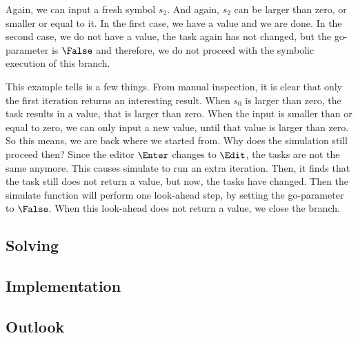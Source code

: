 Again, we can input a fresh symbol $s_2$. And again, $s_2$ can be larger than zero, or smaller or equal to it.
In the first case, we have a value and we are done.
In the second case, we do not have a value, the task again has not changed, but the go-parameter is $\False$ and therefore, we do not proceed with the symbolic execution of this branch.

This example tells is a few things.
From manual inspection, it is clear that only the first iteration returns an interesting result.
When $s_0$ is larger than zero, the task results in a value, that is larger than zero.
When the input is smaller than or equal to zero, we can only input a new value, until that value is larger than zero.
So this means, we are back where we started from.
Why does the simulation still proceed then?
Since the editor $\Enter$ changes to $\Edit$, the tasks are not the same anymore.
This causes simulate to run an extra iteration.
Then, it finds that the task still does not return a value, but now, the tasks have changed.
Then the simulate function will perform one look-ahead step, by setting the go-parameter to $\False$.
When this look-ahead does not return a value, we close the branch.

\subsection{Solving}


\subsection{Implementation}
\subsection{Outlook}
